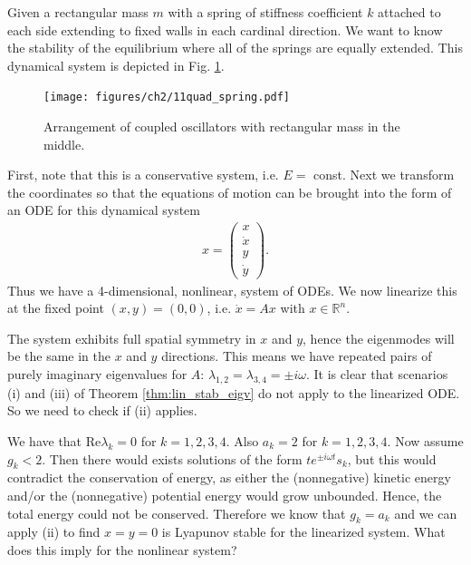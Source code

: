 \begin{ex}
	Given a rectangular mass $m$ with a spring of stiffness coefficient $k$ attached to each side extending to fixed walls in each cardinal direction. We want to know the stability of the equilibrium where all of the springs are equally extended. This dynamical system is depicted in Fig. \ref{fig:quad_spring}.
\begin{figure}[h!]
	\centering
	\texttt{[image: figures/ch2/11quad\_spring.pdf]}
\caption{Arrangement of coupled oscillators with rectangular mass in the middle.} \label{fig:quad_spring}
\end{figure}
First, note that this is a conservative system, i.e. $E=$ const. Next we transform the coordinates so that the equations of motion can be brought into the form of an ODE for this dynamical system
\begin{align}
	{x} = 
	\begin{pmatrix}
		x \\ \dot{x} \\ y  \\ \dot{y}
	\end{pmatrix}.
\end{align}
Thus we have a 4-dimensional, nonlinear, system of ODEs. We now linearize this at the fixed point $(x,y)= (0,0)$, i.e. $\dot{{x}} = {A} {x} $ with ${x} \in \mathbb{R}^{n}$.

The system exhibits full spatial symmetry in $x$ and $y$, hence the eigenmodes will be the same in the $x$ and $y$ directions. This means we have repeated pairs of purely imaginary eigenvalues for ${A} $:  $\lambda_{1,2}=\lambda_{3,4}= \pm i \omega $. It is clear that scenarios (i) and (iii) of Theorem \ref{thm:lin_stab_eigv} do not apply to the linearized ODE. So we need to check if (ii) applies.

We have that $ \textrm{Re} \lambda _{k}=0$ for $k=1,2,3,4$. Also $a_k=2$ for $k=1,2,3,4$. Now assume $g_k < 2$. Then there would exists solutions of the form $te^{\pm i \omega t}{s}_k$, but this would contradict the conservation of energy, as either the (nonnegative) kinetic energy and/or the (nonnegative) potential energy would grow unbounded. Hence, the total energy could not be conserved. Therefore we know that $g_k = a_k$ and we can apply (ii) to find $x=y=0$ is Lyapunov stable for the linearized system. What does this imply for the nonlinear system?
\end{ex}


